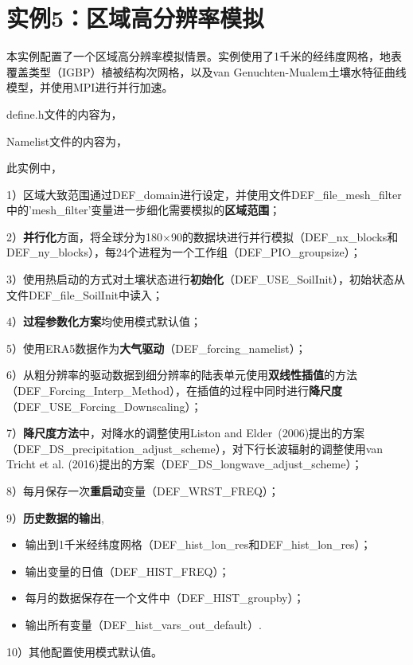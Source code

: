 \documentclass[a4paper,12pt,twoside]{article}
\begin{document}
\section{实例5：区域高分辨率模拟}

本实例配置了一个区域高分辨率模拟情景。实例使用了1千米的经纬度网格，地表覆盖类型（IGBP）植被结构次网格，以及van Genuchten-Mualem土壤水特征曲线模型，并使用MPI进行并行加速。

define.h文件的内容为，


Namelist文件的内容为，


此实例中，\par
1）区域大致范围通过DEF\_domain进行设定，并使用文件DEF\_file\_mesh\_filter中的'mesh\_filter'变量进一步细化需要模拟的\textbf{区域范围}；\par
2）\textbf{并行化}方面，将全球分为180\textdegree$\times$90\textdegree 的数据块进行并行模拟（DEF\_nx\_blocks和DEF\_ny\_blocks），每24个进程为一个工作组（DEF\_PIO\_groupsize）；\par
3）使用热启动的方式对土壤状态进行\textbf{初始化}（DEF\_USE\_SoilInit），初始状态从文件DEF\_file\_SoilInit中读入；\par
4）\textbf{过程参数化方案}均使用模式默认值；\par
5）使用ERA5数据作为\textbf{大气驱动}（DEF\_forcing\_namelist）；\par
6）从粗分辨率的驱动数据到细分辨率的陆表单元使用\textbf{双线性插值}的方法\\ （DEF\_Forcing\_Interp\_Method），在插值的过程中同时进行\textbf{降尺度}\\ （DEF\_USE\_Forcing\_Downscaling）；\par
7）\textbf{降尺度方法}中，对降水的调整使用Liston and Elder~(2006)提出的方案\\ （DEF\_DS\_precipitation\_adjust\_scheme），对下行长波辐射的调整使用van Tricht et al. (2016)提出的方案（DEF\_DS\_longwave\_adjust\_scheme）；\par
8）每月保存一次\textbf{重启动}变量（DEF\_WRST\_FREQ）；\par
9）\textbf{历史数据的输出},
\begin{itemize}[nosep,leftmargin=4em]
    \item 输出到1千米经纬度网格（DEF\_hist\_lon\_res和DEF\_hist\_lon\_res）；
    \item 输出变量的日值（DEF\_HIST\_FREQ）；
    \item 每月的数据保存在一个文件中（DEF\_HIST\_groupby）；
    \item 输出所有变量（DEF\_hist\_vars\_out\_default）.
\end{itemize}\par
10）其他配置使用模式默认值。
\end{document}
